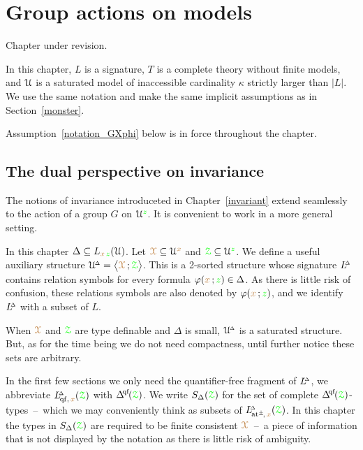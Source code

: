 \chapter{Group actions on models}
\label{actions}

\def\medrel#1{\parbox[t]{5ex}{$\displaystyle\hfil #1$}}
\def\ceq#1#2#3{\parbox[t]{17ex}{$\displaystyle #1$}\medrel{#2}{$\displaystyle #3$}}

\noindent\llap{\textcolor{red}{\Large\warning}\kern1.5ex}\ignorespaces
Chapter under revision.

In this chapter, $L$ is a signature, $T$ is a complete theory without finite models, and $\EuScript U$ is a saturated model of inaccessible cardinality $\kappa$ strictly larger than $|L|$.
We use the same notation and make the same implicit assumptions as in Section~\ref{monster}.

Assumption~\ref{notation_GXphi} below is in force throughout the chapter. 

\section{The dual perspective on invariance}\label{dual_perspective}

The notions of invariance introduceted in Chapter~\ref{invariant} extend seamlessly to the action of a group $G$ on $\EuScript U^{\color{green} z}$.
It is convenient to work in a more general setting.

In this chapter $\Delta\subseteq L_{{\color{brown} x}\,{\color{green} z}}(\EuScript U)$.
Let ${\color{brown}\EuScript X}\subseteq\EuScript U^{\color{brown} x}$ and ${\color{green}\EuScript Z}\subseteq\EuScript U^{\color{green} z}$.
We define a useful auxiliary structure $\EuScript U\kern-.2ex^{\scriptscriptstyle\Delta}=\big\langle{\color{brown}\EuScript X}\,;{\color{green}\EuScript Z}\big\rangle$.
This is a 2-sorted structure whose signature $L\kern-.5ex^{\scriptscriptstyle\Delta}$ contains relation symbols for every formula $\varphi({\color{brown} x}\,;{\color{green} z})\in\Delta$.
As there is little risk of confusion, these relations symbols are also denoted by $\varphi({\color{brown} x}\,;{\color{green} z})$, and we identify $L\kern-.5ex^{\scriptscriptstyle\Delta}$ with a subset of $L$.

When ${\color{brown}\EuScript X}$ and ${\color{green}\EuScript Z}$ are type definable and $\Delta$ is small, $\EuScript U\kern-.2ex^{\scriptscriptstyle\Delta}$ is a saturated structure.
But, as for the time being we do not need compactness, until further notice these sets are arbitrary.

In the first few sections we only need the quantifier-free fragment of $L\kern-.5ex^{\scriptscriptstyle\Delta}$, we abbreviate
$L\kern-.5ex^{\scriptscriptstyle\Delta}_{{\rm\,qf},\,{\color{brown} x}}({\color{green}\EuScript Z})$ with 
$\qfDelta(\grZ)$.
We write $S_\Delta({\color{green}\EuScript Z})$ for the set of complete $\qfDelta(\grZ)$-types~--~which we may conveniently think as subsets of $L\kern-.5ex^{\scriptscriptstyle\Delta}_{{\rm\,at^\pm}\!,\,{\color{brown} x}}({\color{green}\EuScript Z})$.
In this chapter the types in $S_\Delta({\color{green}\EuScript Z})$ are required to be finite consistent ${\color{brown}\EuScript X}$~--~a piece of information that is not displayed by the notation as there is little risk of ambiguity.

